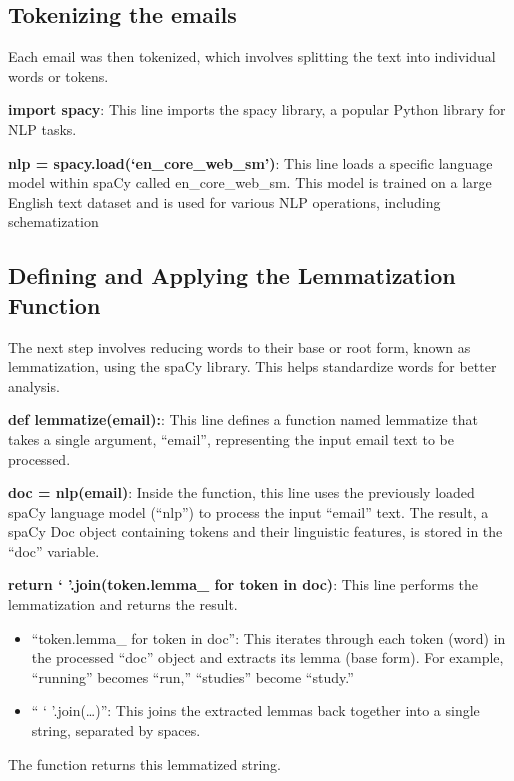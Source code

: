 \subsection{Tokenizing the emails}
\label{subsec:tokenizing-the-emails}

Each email was then tokenized, which involves splitting the text into individual words or tokens.

\textbf{import spacy}: This line imports the spacy library, a popular Python library for NLP tasks.

\textbf{nlp = spacy.load(`en\_core\_web\_sm')}: This line loads a specific language model within spaCy called en\_core\_web\_sm.
This model is trained on a large English text dataset and is used for various NLP operations, including schematization

\subsection{Defining and Applying the Lemmatization Function}
\label{subsec:defining-and-applying-the-lemmatization-function}

The next step involves reducing words to their base or root form, known as lemmatization, using the spaCy library.
This helps standardize words for better analysis.

\textbf{def lemmatize(email):}: This line defines a function named lemmatize that takes a single argument, ``email'', representing the input email text to be processed.

\textbf{doc = nlp(email)}: Inside the function, this line uses the previously loaded spaCy language model (``nlp'') to process the input ``email'' text.
The result, a spaCy Doc object containing tokens and their linguistic features, is stored in the ``doc'' variable.

\textbf{return ` '.join(token.lemma\_ for token in doc)}: This line performs the lemmatization and returns the result.
\begin{itemize}
    \item ``token.lemma\_ for token in doc'': This iterates through each token (word) in the processed ``doc'' object and extracts its lemma (base form).
    For example, ``running'' becomes ``run,'' ``studies'' become ``study.''
    \item `` ` '.join(\ldots)'': This joins the extracted lemmas back together into a single string, separated by spaces.
\end{itemize}
The function returns this lemmatized string.

